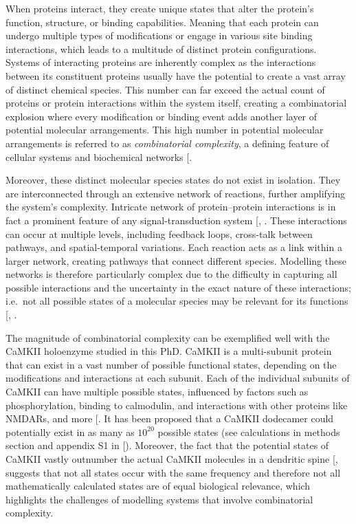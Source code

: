 \documentclass[
  11pt,
  letterpaper,
]{scrreprt}
\begin{document}
When proteins interact, they create unique states that alter the
protein's function, structure, or binding capabilities. Meaning that
each protein can undergo multiple types of modifications or engage in
various site binding interactions, which leads to a multitude of
distinct protein configurations. Systems of interacting proteins are
inherently complex as the interactions between its constituent proteins
usually have the potential to create a vast array of distinct chemical
species. This number can far exceed the actual count of proteins or
protein interactions within the system itself, creating a combinatorial
explosion where every modification or binding event adds another layer
of potential molecular arrangements. This high number in potential
molecular arrangements is referred to as \emph{combinatorial
complexity}, a defining feature of cellular systems and biochemical
networks {[}\citeproc{ref-stefan2014Multistate}{282}{]}.

Moreover, these distinct molecular species states do not exist in
isolation. They are interconnected through an extensive network of
reactions, further amplifying the system's complexity. Intricate network
of protein--protein interactions is in fact a prominent feature of any
signal-transduction system {[},
\citeproc{ref-hunter2000Signaling}{284}{]}. These interactions can occur
at multiple levels, including feedback loops, cross-talk between
pathways, and spatial-temporal variations. Each reaction acts as a link
within a larger network, creating pathways that connect different
species. Modelling these networks is therefore particularly complex due
to the difficulty in capturing all possible interactions and the
uncertainty in the exact nature of these interactions; i.e.~not all
possible states of a molecular species may be relevant for its functions
{[},
\citeproc{ref-changeux2005Allosteric}{285}{]}.

The magnitude of combinatorial complexity can be exemplified well with
the CaMKII holoenzyme studied in this PhD. CaMKII is a multi-subunit
protein that can exist in a vast number of possible functional states,
depending on the modifications and interactions at each subunit. Each of
the individual subunits of CaMKII can have multiple possible states,
influenced by factors such as phosphorylation, binding to calmodulin,
and interactions with other proteins like NMDARs, and more
{[}\citeproc{ref-nicoll2023Synapticc}{154}{]}. It has been proposed that
a CaMKII dodecamer could potentially exist in as many as \(10^{20}\)
possible states (see calculations in methods section and appendix S1 in
{[}\citeproc{ref-pharris2019Multistate}{185}{]}). Moreover, the fact
that the potential states of CaMKII vastly outnumber the actual CaMKII
molecules in a dendritic spine
{[}\citeproc{ref-pharris2019Multistate}{185}{]}, suggests that not all
states occur with the same frequency and therefore not all
mathematically calculated states are of equal biological relevance,
which highlights the challenges of modelling systems that involve
combinatorial complexity.
\end{document}

